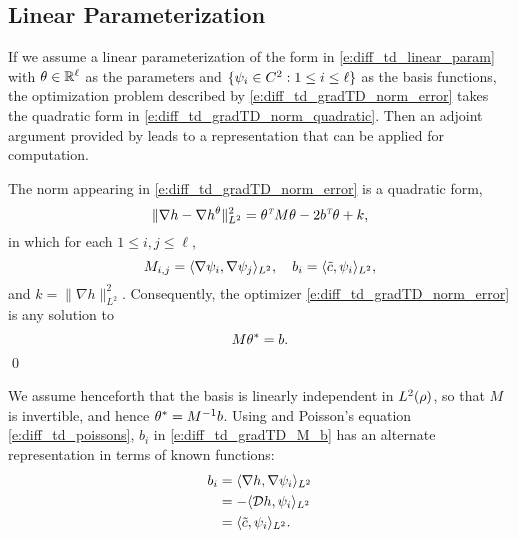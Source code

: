 \subsection{Linear Parameterization}
If we assume a linear parameterization of the form in \eqref{e:diff_td_linear_param} with $\theta \in \mathbb{R}^\ell$ as the parameters and $\{\psi_i \in C^2: 1\leq i \leq \ell \}$ as the basis functions, the optimization problem described by \eqref{e:diff_td_gradTD_norm_error} takes the quadratic form in \eqref{e:diff_td_gradTD_norm_quadratic}. Then an adjoint argument provided by  leads to a representation that can be applied for computation.  
\begin{lemma}
	\label{lemma:gradTD}
	The norm appearing in \eqref{e:diff_td_gradTD_norm_error} is a quadratic form,
	\begin{equation}
	\|\nabla h - \nabla h^\param\|^2_{L^2} = \param^\transpose M \param - 2b^\transpose\param + k ,
	\label{e:diff_td_gradTD_norm_quadratic}
	\end{equation}
	in which for each $1\le i, j\le \ell$,
	\begin{equation}
	M_{i,j} = \langle \gradbasis_i, \gradbasis_j \rangle_{L^2}, \quad b_i = \langle \tilc, \basis_i \rangle_{L^2},
	\label{e:diff_td_gradTD_M_b}
	\end{equation}
	and $k = \| \nabla h \|^2_{L^2}$.  Consequently, the optimizer \eqref{e:diff_td_gradTD_norm_error}
	is any solution to %
	\begin{equation}
	M \param^* = b.
	\label{e:diff_td_gradTD_theta}
	\end{equation}
	\qed
\end{lemma}

We assume henceforth  that the basis is linearly independent in $L^2(\rho)$, so that $M$ is invertible, and hence $\theta^* = M^{-1}b$. Using  and Poisson's equation \eqref{e:diff_td_poissons}, $b_i$ in \eqref{e:diff_td_gradTD_M_b} has an alternate representation in terms of known functions:
\begin{equation}
\begin{aligned}
b_i & = \langle \nabla h, \nabla \basis_i \rangle_{L^2} \\ 
& = - \langle \generate h, \basis_i \rangle_{L^2} \\ 
& =\langle \tilc, \basis_i \rangle_{L^2}.
\label{e:diff_td_gradTD_b_alt}
\end{aligned}
\end{equation}

